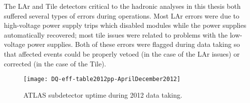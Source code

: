 The LAr and Tile detectors critical to the hadronic analyses in this thesis both suffered several types of errors during operations. Most LAr errors were due to high-voltage power supply trips which disabled modules while the power supplies automatically recovered; most tile issues were related to problems with the low-voltage power supplies. Both of these errors were flagged during data taking so that affected events could be properly vetoed (in the case of the LAr issues) or corrected (in the case of the Tile).


\begin{figure}
\centering
\texttt{[image: DQ-eff-table2012pp-AprilDecember2012]}
\label{fig:detector:uptime}
\caption{ATLAS subdetector uptime during 2012 data taking.}
\end{figure}

